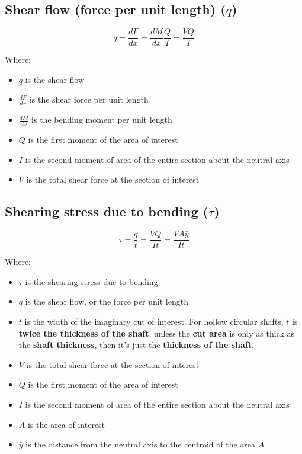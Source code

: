 \documentclass[11pt]{article}
\begin{document}
\subsection{Shear flow (force per unit length) (\(q\))}
\label{sec:org265429d}
\[q = \frac{dF}{dx} = \frac{dM}{dx} \frac{Q}{I} = \frac{VQ}{I}\]

Where:
\begin{itemize}
\item \(q\) is the shear flow
\item \(\frac{dF}{dx}\) is the shear force per unit length
\item \(\frac{dM}{dx}\) is the bending moment per unit length
\item \(Q\) is the first moment of the area of interest
\item \(I\) is the second moment of area of the entire section about the neutral axis
\item \(V\) is the total shear force at the section of interest
\end{itemize}

\newpage

\subsection{Shearing stress due to bending (\(\tau\))}
\label{sec:orgd6a1d8c}
\[\tau = \frac{q}{t} = \frac{VQ}{It} = \frac{VA \bar{y}}{It}\]

Where:
\begin{itemize}
\item \(\tau\) is the shearing stress due to bending
\item \(q\) is the shear flow, or the force per unit length
\item \(t\) is the width of the imaginary cut of interest. For hollow circular shafts, \(t\) is \textbf{twice the thickness of the shaft}, unless the \textbf{cut area} is only as thick as the \textbf{shaft thickness}, then it's just the \textbf{thickness of the shaft}.
\item \(V\) is the total shear force at the section of interest
\item \(Q\) is the first moment of the area of interest
\item \(I\) is the second moment of area of the entire section about the neutral axis
\item \(A\) is the area of interest
\item \(\bar{y}\) is the distance from the neutral axis to the centroid of the area \(A\)
\end{itemize}
\end{document}
